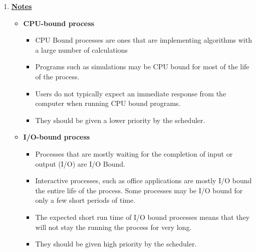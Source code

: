 \documentclass[12pt]{article}
\begin{document}
\begin{enumerate}[1.]
\begin{enumerate}[a)]
\begin{itemize}
\begin{itemize}
            \end{itemize}
        \end{itemize}
    \end{enumerate}

    \item

    \bigskip

    \underline{\textbf{Notes}}

    \begin{itemize}
        \item \textbf{CPU-bound process}

        \begin{itemize}
            \item CPU Bound processes are ones that are implementing algorithms
            with a large number of calculations
            \item Programs such as simulations may be CPU bound for most of the life of the process.
            \item Users do not typically expect an immediate response from the computer when running CPU bound programs.
            \item They should be given a lower priority by the scheduler.
        \end{itemize}
        \item \textbf{I/O-bound process}

        \begin{itemize}
            \item Processes that are mostly waiting for the completion of input or output (I/O) are I/O Bound.
            \item Interactive processes, such as office applications are mostly I/O bound the entire life of the process. Some processes may be I/O bound for only a few short periods of time.
            \item The expected short run time of I/O bound processes means that they will not stay the running the process for very long.
            \item They should be given high priority by the scheduler.
        \end{itemize}
    \end{itemize}

\end{enumerate}
\end{document}

